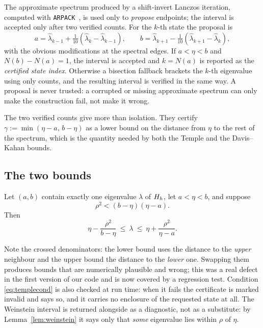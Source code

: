 The approximate spectrum produced by a shift-invert Lanczos iteration,
computed with \texttt{ARPACK}~\citep{lehoucq1998}, is used only to
\emph{propose} endpoints; the interval is accepted only after two verified
counts. For the $k$-th state the proposal is
\begin{equation}
  a=\hat\lambda_{k-1}+\tfrac{1}{10}(\hat\lambda_k-\hat\lambda_{k-1}),\qquad
  b=\hat\lambda_{k+1}-\tfrac{1}{10}(\hat\lambda_{k+1}-\hat\lambda_k),
\end{equation}
with the obvious modifications at the spectral edges. If $a<\eta<b$ and
$N(b)-N(a)=1$, the interval is accepted and $k=N(a)$ is reported as the
\emph{certified state index}. Otherwise a bisection fallback brackets the
$k$-th eigenvalue using only counts, and the resulting interval is verified in
the same way. A proposal is never trusted: a corrupted or missing approximate
spectrum can only make the construction fail, not make it wrong.

The two verified counts give more than isolation. They certify
$\gamma:=\min(\eta-a,\,b-\eta)$ as a lower bound on the distance from $\eta$
to the rest of the spectrum, which is the quantity needed by both the Temple
and the Davis--Kahan bounds.

\subsection{The two bounds}
\label{sec:bounds}

\begin{theorem}
\label{thm:temple}
Let $(a,b)$ contain exactly one eigenvalue $\lambda$ of $H_h$, let
$a<\eta<b$, and suppose
\begin{equation}
  \rho^2 < (b-\eta)(\eta-a).
  \label{eq:templecond}
\end{equation}
Then
\begin{equation}
  \eta-\frac{\rho^2}{b-\eta}\ \le\ \lambda\ \le\ \eta+\frac{\rho^2}{\eta-a}.
  \label{eq:temple}
\end{equation}
\end{theorem}

Note the crossed denominators: the lower bound uses the distance to the
\emph{upper} neighbour and the upper bound the distance to the \emph{lower}
one. Swapping them produces bounds that are numerically plausible and wrong;
this was a real defect in the first version of our code and is now covered by
a regression test. Condition \eqref{eq:templecond} is also checked at run
time: when it fails the certificate is marked invalid and says so, and it
carries no enclosure of the requested state at all. The Weinstein interval is
returned alongside as a diagnostic, not as a substitute: by
Lemma~\ref{lem:weinstein} it says only that \emph{some} eigenvalue lies within
$\rho$ of $\eta$.

